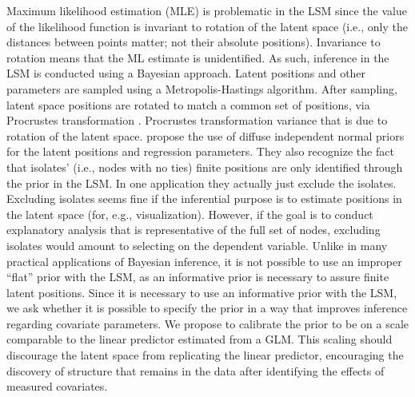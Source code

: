 \documentclass[11pt]{article}
\begin{document}
Maximum likelihood estimation (MLE) is problematic in the LSM since the value of the likelihood function is invariant to rotation of the latent space \citep{hoff2002latent} (i.e., only the distances between points matter; not their absolute positions). Invariance to rotation means that the ML estimate is unidentified. As such, inference in the LSM is conducted using a Bayesian approach. Latent positions and other parameters are sampled using a Metropolis-Hastings algorithm. After sampling, latent space positions are rotated to match a common set of positions, via Procrustes transformation \citep{borg2005modern}. Procrustes transformation variance that is due to rotation of the latent space.  \cite{hoff2002latent} propose the use of diffuse independent normal priors for the latent positions and regression parameters. They also recognize the fact that isolates' (i.e., nodes with no ties) finite positions are only identified through the prior in the LSM. In one application they actually just exclude the isolates. Excluding isolates seems fine if the inferential purpose is to estimate positions in the latent space (for, e.g., visualization). However, if the goal is to conduct explanatory analysis that is representative of the full set of nodes, excluding isolates would amount to selecting on the dependent variable. Unlike in many practical applications of Bayesian inference, it is not possible to use an improper ``flat'' prior \citep{tibshirani1989noninformative} with the LSM, as an informative prior is necessary to assure finite latent positions.
Since it is necessary to use an informative prior with the LSM, we ask whether it is possible to specify the prior in a way that improves inference regarding covariate parameters. We propose to calibrate the prior to be on a scale comparable to the linear predictor estimated from a GLM. This scaling should discourage the latent space from replicating the linear predictor, encouraging the discovery of structure that remains in the data after identifying the effects of measured covariates.  
\end{document}
